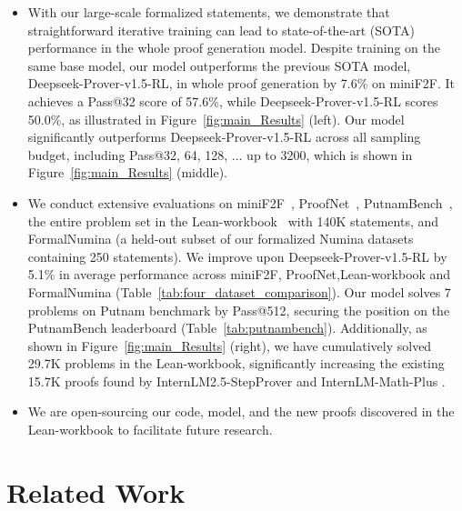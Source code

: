 \begin{itemize}
    \item With our large-scale formalized statements, we demonstrate that straightforward iterative training can lead to state-of-the-art (SOTA) performance in the whole proof generation model. Despite training on the same base model, our model outperforms the previous SOTA model, Deepseek-Prover-v1.5-RL, in whole proof generation by 7.6\% on miniF2F. It achieves a Pass@32 score of 57.6\%, while Deepseek-Prover-v1.5-RL scores 50.0\%, as illustrated in Figure~\ref{fig:main_Results} (left). Our model significantly outperforms Deepseek-Prover-v1.5-RL across all sampling budget, including Pass@32, 64, 128, ... up to 3200, which is shown in Figure~\ref{fig:main_Results} (middle).

    \item We conduct extensive evaluations on miniF2F~\citep{zheng2021minif2f}, ProofNet~\citep{azerbayev2023proofnet}, PutnamBench~\citep{tsoukalas2024putnambench}, the entire problem set in the Lean-workbook~\citep{ying2024lean} with 140K statements, and FormalNumina (a held-out subset of our formalized Numina datasets containing 250 statements). We improve upon Deepseek-Prover-v1.5-RL by 5.1\% in average performance across miniF2F, ProofNet,Lean-workbook and FormalNumina (Table~\ref{tab:four_dataset_comparison}).  Our model solves 7 problems on Putnam benchmark by Pass@512, securing the  position on the PutnamBench leaderboard (Table~\ref{tab:putnambench}).  Additionally, as shown in Figure~\ref{fig:main_Results} (right), we have cumulatively solved 29.7K problems in the Lean-workbook, significantly increasing the existing 15.7K proofs found by InternLM2.5-StepProver \citep{wu2024internlm2} and InternLM-Math-Plus \citep{ying2024internlm}.
    \item We are open-sourcing our code, model, and the new proofs discovered in the Lean-workbook to facilitate future research.
\end{itemize}

\section{Related Work}


